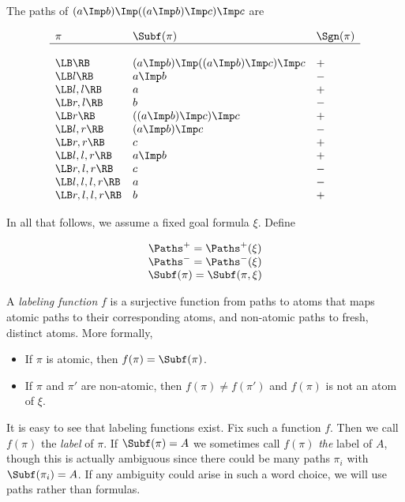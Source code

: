 \begin{example}
  The paths of $(a\Imp b) \Imp ((a\Imp b) \Imp c) \Imp c$ are

  \[
  \begin{array}{lll}
    \pi & \Subf(\pi) & \Sgn(\pi) \\
    \hline \\
    \LB\RB & (a\Imp b) \Imp ((a\Imp b) \Imp c) \Imp c & + \\
    \LB l\RB & a\Imp b & - \\
    \LB l,l\RB & a & + \\
    \LB r,l\RB & b & - \\
    \LB r\RB & ((a\Imp b) \Imp c) \Imp c & + \\
    \LB l,r\RB & (a\Imp b) \Imp c & - \\
    \LB r,r\RB & c & + \\
    \LB l,l,r\RB & a\Imp b & + \\
    \LB r,l,r\RB & c & - \\
    \LB l,l,l,r\RB & a & - \\
    \LB r,l,l,r\RB & b & + \\
  \end{array}
  \]
\end{example}

In all that follows, we assume a fixed goal formula $\xi$.
Define

\[
\begin{array}{c}
  \Paths^+ = \Paths^+(\xi)\\
  \Paths^- = \Paths^-(\xi)\\
  \Subf(\pi) = \Subf(\pi,\xi)\\
\end{array}
\]

\begin{definition}[Labels]
  A \emph{labeling function} $f$ is a surjective function from paths to atoms
  that maps atomic paths to their corresponding atoms, and non-atomic paths
  to fresh, distinct atoms.  More formally,

  \begin{itemize}
  \item If $\pi$ is atomic, then $f(\pi) = \Subf(\pi)$.
  \item If $\pi$ and $\pi'$ are non-atomic, then $f(\pi) \neq f(\pi')$
    and $f(\pi)$ is not an atom of $\xi$.
  \end{itemize}

  \noindent
  It is easy to see that labeling functions exist.  Fix such a function $f$.  Then
  we call $f(\pi)$ the \emph{label} of $\pi$.  If $\Subf(\pi) = A$ we sometimes
  call $f(\pi)$ \emph{the} label of $A$, though this is actually ambiguous since there
  could be many paths $\pi_i$ with $\Subf(\pi_i) = A$.  If any ambiguity could
  arise in such a word choice, we will use paths rather than formulas.
\end{definition}

